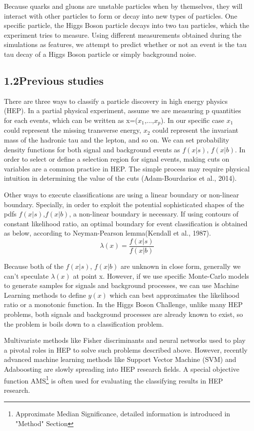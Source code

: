 \documentclass[11pt]{article}
\begin{document}
Because quarks and gluons are unstable particles when by themselves, they will interact with other particles to form or decay into new types of particles. One specific particle, the Higgs Boson particle decays into two tau particles, which the experiment tries to measure. Using different measurements obtained during the simulations as features, we attempt to predict whether or not an event is the tau tau decay of a Higgs Boson particle or simply background noise.

\subsection*{1.2\quad Previous studies}
There are three ways to classify a particle discovery in high energy physics (HEP). In a partial physical experiment, assume we are measuring p quantities for each events, which can be written as x=($x_{1}$,...,$x_{p}$). In our specific case $x_{1}$ could represent the missing transverse energy, $x_{2}$ could represent the invariant mass of the hadronic tau and the lepton, and so on. We can set probability density functions for both signal and background events as $f(x|s)$, $f(x|b)$. In order to select or define a selection region for signal events, making cuts on variables are a common practice in HEP. The simple process may require physical intuition in determining the value of the cuts (Adam-Bourdarios et al., 2014).   

Other ways to execute classifications are using a linear boundary or non-linear boundary. Specially, in order to exploit the potential sophisticated shapes of the pdfs $f(x|s)$,$f(x|b)$, a non-linear boundary is necessary. If using contours of constant likelihood ratio, an optimal boundary for event classification is obtained as below, according to Neyman-Pearson lemma(Kendall et al., 1987). $$\lambda(x)=\frac{f(x|s)}{f(x|b)}$$

Because both of the $f(x|s)$, $f(x|b)$ are unknown in close form, generally we can't speculate $\lambda(x)$ at point x. However, if we use specific Monte-Carlo models to generate samples for signals and background processes, we can use Machine Learning methods to define $y(x)$ which can best approximates the likelihood ratio or a monotonic function. In the Higgs Boson Challenge, unlike many HEP problems, both signals and background processes are already known to exist, so the problem is boils down to a classification problem.

Multivariate methods like Fisher discriminants and neural networks used to play a pivotal roles in HEP to solve such problems described above. However, recently advanced machine learning methods like Support Vector Machine (SVM) and Adaboosting are slowly spreading into HEP research fields. A special objective function AMS\footnote{Approximate Median Significance, detailed information is introduced in "Method" Section} is often used for evaluating the classifying results in HEP research.
\end{document}
